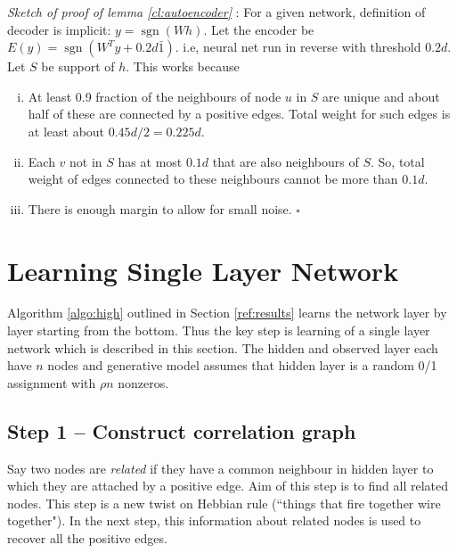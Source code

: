 \documentclass[11pt]{article}
\newcommand{\sgn}{\operatorname{sgn}}
\begin{document}
	\emph{Sketch of proof of lemma \ref{cl:autoencoder}} : For a given network, definition of decoder is implicit: $y = \sgn(Wh)$. Let the encoder be $E(y) = \sgn(W^Ty+0.2d\bar{1})$. i.e, neural net run in reverse with threshold $0.2d$. Let $S$ be support of $h$. This works because 
	\vspace{-2pt}
	\begin{enumerate}[(i)] \itemsep=-2pt 
		\item At least 0.9 fraction of the neighbours of node $u$ in $S$ are unique and about half of these are connected by a positive edges. Total weight for such edges is at least about $0.45d/2 = 0.225d$.

		\item Each $v$ not in $S$ has at most $0.1d$ that are also neighbours of $S$. So, total weight of  edges connected to these neighbours cannot be more than $0.1d$.

		\item There is enough margin to allow for small noise. $\square$
	\end{enumerate}


	\section{Learning Single Layer Network}
	Algorithm \ref{algo:high} outlined in Section \ref{ref:results} learns the network layer by layer starting from the bottom. Thus the key step is learning of a single layer network which is described in this section. The hidden and observed layer each have $n$ nodes and generative model assumes that hidden layer is a random 0/1 assignment with $\rho n$ nonzeros. 

	\subsection{Step 1 -- Construct correlation graph}
	Say two nodes are \emph{related} if they have a common neighbour in hidden layer to which they are attached by a positive edge. Aim of this step is to find all related nodes. This step is a new twist on Hebbian rule (``things that fire together wire together"). In the next step, this information about related nodes is used to recover all the positive edges.
\end{document}
